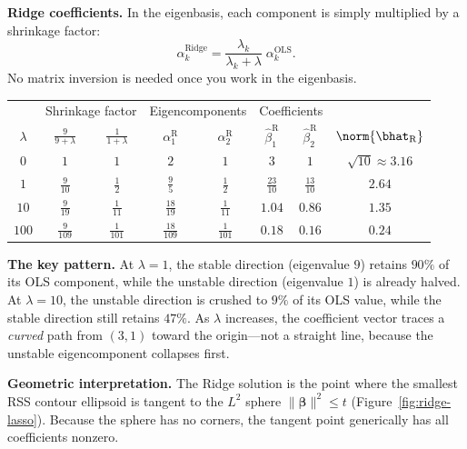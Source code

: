 \begin{example}
\medskip\noindent\textbf{Ridge coefficients.}
In the eigenbasis, each component is simply multiplied by a shrinkage
factor:
\[
\alpha_k^{\text{Ridge}}
= \frac{\lambda_k}{\lambda_k + \lambda}\;\alpha_k^{\text{OLS}}.
\]
No matrix inversion is needed once you work in the eigenbasis.

\begin{center}
\renewcommand{\arraystretch}{1.4}
\begin{tabular}{c|cc|cc|cc|c}
\toprule
& \multicolumn{2}{c|}{Shrinkage factor}
& \multicolumn{2}{c|}{Eigencomponents}
& \multicolumn{2}{c|}{Coefficients} & \\
$\lambda$
& $\frac{9}{9+\lambda}$ & $\frac{1}{1+\lambda}$
& $\alpha_1^{\text{R}}$ & $\alpha_2^{\text{R}}$
& $\hat\beta_1^{\text{R}}$ & $\hat\beta_2^{\text{R}}$
& $\norm{\bhat_{\text{R}}}$ \\
\midrule
$0$   & $1$ & $1$
      & $2$ & $1$
      & $3$ & $1$
      & $\sqrt{10}\approx 3.16$ \\[2pt]
$1$   & $\frac{9}{10}$ & $\frac{1}{2}$
      & $\frac{9}{5}$ & $\frac{1}{2}$
      & $\frac{23}{10}$ & $\frac{13}{10}$
      & $2.64$ \\[2pt]
$10$  & $\frac{9}{19}$ & $\frac{1}{11}$
      & $\frac{18}{19}$ & $\frac{1}{11}$
      & $1.04$ & $0.86$
      & $1.35$ \\[2pt]
$100$ & $\frac{9}{109}$ & $\frac{1}{101}$
      & $\frac{18}{109}$ & $\frac{1}{101}$
      & $0.18$ & $0.16$
      & $0.24$ \\
\bottomrule
\end{tabular}
\end{center}

\medskip\noindent\textbf{The key pattern.}
At $\lambda=1$, the stable direction (eigenvalue $9$) retains $90\%$ of
its OLS component, while the unstable direction (eigenvalue $1$) is
already halved.
At $\lambda=10$, the unstable direction is crushed to $9\%$ of its OLS
value, while the stable direction still retains $47\%$.
As $\lambda$ increases, the coefficient vector traces a \emph{curved}
path from $(3,1)$ toward the origin---not a straight line, because
the unstable eigencomponent collapses first.
\end{example}


\medskip
\noindent\textbf{Geometric interpretation.}
The Ridge solution is the point where the smallest RSS contour
ellipsoid is tangent to the $L^2$ sphere
$\|\bm{\beta}\|^2 \le t$ (Figure~\ref{fig:ridge-lasso}).
Because the sphere has no corners, the tangent point generically
has all coefficients nonzero.


